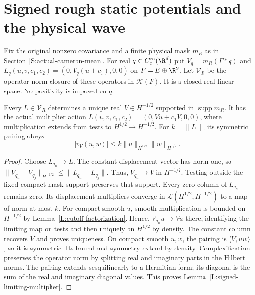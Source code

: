 \section{Signed rough static potentials and the physical wave}
\label{S:signed-static-wave}

Fix the original nonzero covariance and a finite physical mask $m_R$
as in Section~\ref{S:actual-cameron-mean}.
For real $q\in C_c^\infty(\R^d)$ put
$V_q=m_R(\Gamma*q)$ and
$L_q(u,v,c_1,c_2)=(0,V_q(u+c_1),0,0)$ on $F=E\oplus\R^2$.
Let $\mathcal V_R$ be the operator-norm closure of these operators
in $\mathcal K(F)$. It is a closed real linear space.
No positivity is imposed on $q$.

\begin{lemma}\label{L:signed-limiting-multiplier}
  Every $L\in\mathcal V_R$ determines a unique real
  $V\in H^{-1/2}$ supported in $\operatorname{supp}m_R$.
  It has the actual multiplier action
  $L(u,v,c_1,c_2)=(0,Vu+c_1V,0,0)$, where multiplication
  extends from tests to $H^{1/2}\to H^{-1/2}$.
  For $k=\|L\|$, its symmetric pairing obeys
  \begin{equation}\label{E:signed-multiplier-form}
    |v_V(u,w)|\le k\|u\|_{H^{1/2}}\|w\|_{H^{1/2}} .
  \end{equation}
\end{lemma}

\begin{proof}
  Choose $L_{q_n}\to L$. The constant-displacement vector has
  norm one, so $\|V_{q_n}-V_{q_j}\|_{H^{-1/2}}\le\|L_{q_n}-L_{q_j}\|$.
  Thus, $V_{q_n}\to V$ in $H^{-1/2}$.
  Testing outside the fixed compact mask support preserves that support.
  Every zero column of $L_{q_n}$ remains zero.
  Its displacement multipliers converge in
  $\mathcal L(H^{1/2},H^{-1/2})$ to a map of norm at most $k$.
  For compact smooth $u$, smooth multiplication is bounded on
  $H^{-1/2}$ by Lemma~\ref{L:cutoff-factorization}.
  Hence, $V_{q_n}u\to Vu$ there, identifying the limiting map
  on tests and then uniquely on $H^{1/2}$ by density.
  The constant column recovers $V$ and proves uniqueness.
  On compact smooth $u,w$, the pairing is $\langle V,uw\rangle$,
  so it is symmetric. Its bound and symmetry extend by density.
  Complexification preserves the operator norm by splitting real
  and imaginary parts in the Hilbert norms. The pairing extends
  sesquilinearly to a Hermitian form; its diagonal is the sum of
  the real and imaginary diagonal values.
  This proves Lemma~\ref{L:signed-limiting-multiplier}.
\end{proof}

